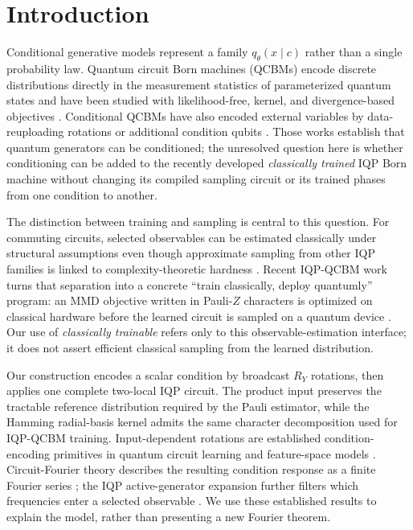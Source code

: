 \documentclass[a4paper,twocolumn,11pt,unpublished]{quantumarticle}
\begin{document}
\section{Introduction}

Conditional generative models represent a family $q_\theta(x\mid c)$ rather
than a single probability law.  Quantum circuit Born machines (QCBMs) encode
discrete distributions directly in the measurement statistics of
parameterized quantum states and have been studied with likelihood-free,
kernel, and divergence-based objectives
\cite{liuDifferentiableLearning2018,benedettiGenerativeModeling2019,
gaoQuantumGenerativeModels2018,leadbeaterFDivergences2021}.  Conditional QCBMs have
also encoded external variables by data-reuploading rotations or additional
condition qubits
\cite{kissConditionalBornMachine2022,zengConditionalQCBM2023}.  Those works
establish that quantum generators can be conditioned; the unresolved question
here is whether conditioning can be added to the recently developed
\emph{classically trained} IQP Born machine without changing its compiled
sampling circuit or its trained phases from one condition to another.

The distinction between training and sampling is central to this question.
For commuting circuits, selected observables can be estimated classically
under structural assumptions even though approximate sampling from other IQP
families is linked to complexity-theoretic hardness
\cite{shepherdTemporallyUnstructured2009,nestSimulatingQuantumComputers2011,
niCommutingQuantumCircuits2012,
bremnerClassicalSimulation2011,bremnerAverageCase2016,
bremnerAchievingQuantumSupremacy2017}.  Recent IQP-QCBM work turns that
separation into a concrete ``train classically, deploy quantumly'' program:
an MMD objective written in Pauli-$Z$ characters is optimized on classical
hardware before the learned circuit is sampled on a quantum device
\cite{recio-armengolIQPoptFastOptimization2025,
recio-armengolTrainClassicalDeploy2026}.  Our use of \emph{classically
trainable} refers only to this observable-estimation interface; it does not
assert efficient classical sampling from the learned distribution.

Our construction encodes a scalar condition by broadcast $R_Y$ rotations,
then applies one complete two-local IQP circuit.  The product input preserves
the tractable reference distribution required by the Pauli estimator, while
the Hamming radial-basis kernel admits the same character decomposition used
for IQP-QCBM training.  Input-dependent rotations are established condition-
encoding primitives in quantum circuit learning and feature-space models
\cite{mitaraiQuantumCircuitLearning2018,schuldQuantumFeatureHilbert2019,
havlicekSupervisedLearning2019}.  Circuit-Fourier theory describes the
resulting condition response as a finite Fourier series
\cite{gilVidalInputRedundancy2020,schuldEffectDataEncoding2021,
casasMultidimensionalFourier2023}; the IQP active-generator expansion further
filters which frequencies enter a selected observable
\cite{recio-armengolTrainClassicalDeploy2026}.  We use these established
results to explain the model, rather than presenting a new Fourier theorem.
\end{document}
